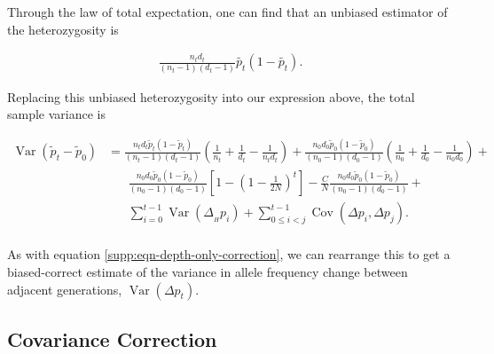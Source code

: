 \documentclass[11pt]{article}
\DeclareMathOperator{\var}{Var}
\DeclareMathOperator{\cov}{Cov}
\begin{document}
Through the law of total expectation, one can find that an unbiased estimator
of the heterozygosity is 

\begin{align}
  \frac{n_t d_t}{(n_t-1) (d_t-1)} \widetilde{p_t}(1-\widetilde{p_t}).
\end{align}

Replacing this unbiased heterozygosity into our expression above, the total
sample variance is

\begin{align}
  \var(\widetilde{p}_t - \widetilde{p}_0) &= 
  \frac{n_t d_t \widetilde{p}_t(1-\widetilde{p}_t)}{(n_t-1)(d_t-1)} \left(\frac{1}{n_t} + \frac{1}{d_t} - \frac{1}{n_t d_t} \right) + 
 \frac{n_0 d_0 \widetilde{p}_0(1-\widetilde{p}_0)}{(n_0-1)(d_0-1)} \left( \frac{1}{n_0} + \frac{1}{d_0} - \frac{1}{n_0 d_0}\right) + \\ & \nonumber\;\;\;\;\;\;
 \frac{n_0 d_0 \widetilde{p}_0(1-\widetilde{p}_0)}{(n_0-1)(d_0-1)}   \left[1 - \left(1-\frac{1}{2N}\right)^t \right]  - \frac{C}{N}  \frac{n_0 d_0 \widetilde{p}_0(1-\widetilde{p}_0)}{(n_0-1)(d_0-1)} + \\ \nonumber & \;\;\;\;\;\; \sum_{i=0}^{t-1} \var(\Delta_{_H} p_i)  + \sum_{0 \le i < j}^{t-1} \cov(\Delta p_i, \Delta p_j).  \\
\end{align}

As with equation \eqref{supp:eqn-depth-only-correction}, we can rearrange this
to get a biased-correct estimate of the variance in allele frequency change
between adjacent generations, $\var(\Delta p_t)$. 


\subsection{Covariance Correction}
\label{supp:cov-corr}
\end{document}
